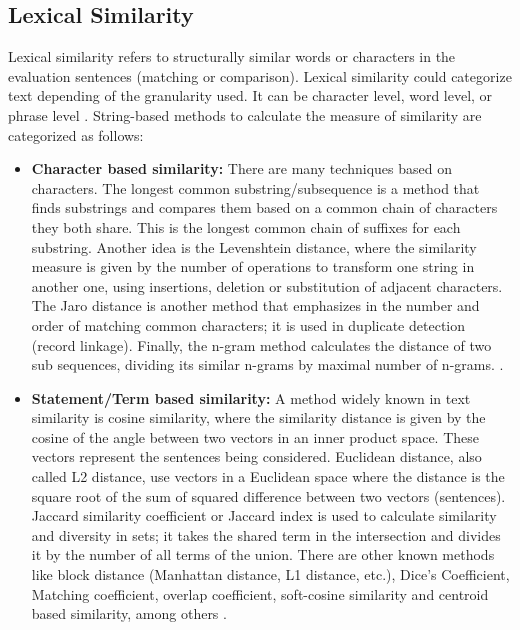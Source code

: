 \documentclass[12pt]{report}
\begin{document}
\subsection{Lexical Similarity}
Lexical similarity refers to structurally similar words or characters in the evaluation sentences (matching or comparison). 
Lexical similarity could categorize text depending of the granularity used. It can be character level, word level, or phrase level \cite{Ganesan2015,Pradhan2015}. String-based methods to calculate the measure of similarity are categorized as follows:

\begin{itemize}[nolistsep]
	\item \textbf{Character based similarity:} There are many techniques  based on characters. The longest common substring/subsequence is a method that finds substrings and compares them based on a common chain of characters they both share. This is the longest common chain of suffixes for each substring. Another idea is the Levenshtein distance, where the similarity measure is given by the number of operations to transform one string in another one, using insertions, deletion or substitution of adjacent characters. The Jaro distance is another method that emphasizes in the number and order of matching common characters; it is used in duplicate detection (record linkage). Finally, the n-gram method  calculates the distance of two sub sequences, dividing its similar n-grams by maximal number of n-grams. \cite{Pradhan2015,Majumder2016,Gomaa2013}.
	\item \textbf{Statement/Term based similarity:} A method widely known in text similarity is cosine similarity, where the similarity distance is given by the cosine of the angle between two vectors in an inner product space. These vectors represent the sentences being considered. Euclidean distance, also called L2 distance, use vectors in a Euclidean space where the distance is the square root of the sum of squared difference between two vectors (sentences). Jaccard similarity coefficient or Jaccard index is used to calculate similarity and diversity in sets; it takes the shared term in the intersection and divides it by the number of all terms of the union. There are other known methods like block distance (Manhattan distance, L1 distance, etc.), Dice's Coefficient, Matching coefficient, overlap coefficient, soft-cosine similarity and centroid based similarity, among others \cite{Pradhan2015,Majumder2016,Gomaa2013}.
\end{itemize}
\end{document}
